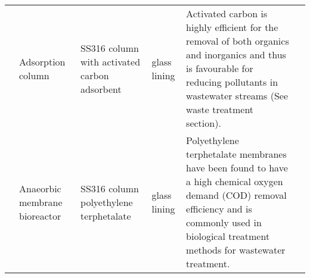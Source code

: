 \begin{table}[H]
\begin{tabular}{@{}p{3cm}|p{3cm}|p{3cm}|p{3cm}|p{3cm}l@{}}
                                                      & Adsorption column                                         & SS316   column with activated carbon adsorbent & glass lining                                       & Activated   carbon is highly efficient for the removal of both organics and inorganics   and thus is favourable for reducing pollutants in wastewater streams (See   waste treatment section).                                                                             \\
                    & Anaeorbic membrane bioreactor                            & SS316   column polyethylene terphetalate                                                      & glass lining                                       & Polyethylene   terphetalate membranes have been found to have a high chemical oxygen demand   (COD) removal efficiency and is commonly used in biological treatment methods   for wastewater treatment.                                                   \\ \bottomrule
\end{tabular}
\end{table}